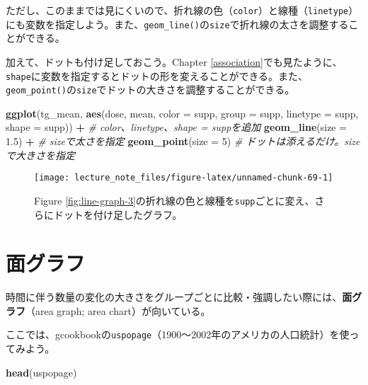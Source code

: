 \documentclass[]{book}
\newenvironment{Shaded}{\begin{snugshade}}{\end{snugshade}}
\newcommand{\KeywordTok}[1]{\textcolor[rgb]{0.13,0.29,0.53}{\textbf{#1}}}
\newcommand{\DataTypeTok}[1]{\textcolor[rgb]{0.13,0.29,0.53}{#1}}
\newcommand{\DecValTok}[1]{\textcolor[rgb]{0.00,0.00,0.81}{#1}}
\newcommand{\FloatTok}[1]{\textcolor[rgb]{0.00,0.00,0.81}{#1}}
\newcommand{\StringTok}[1]{\textcolor[rgb]{0.31,0.60,0.02}{#1}}
\newcommand{\CommentTok}[1]{\textcolor[rgb]{0.56,0.35,0.01}{\textit{#1}}}
\newcommand{\OperatorTok}[1]{\textcolor[rgb]{0.81,0.36,0.00}{\textbf{#1}}}
\newcommand{\NormalTok}[1]{#1}
\begin{document}
ただし、このままでは見にくいので、折れ線の色（\texttt{color}）と線種（\texttt{linetype}）にも変数を指定しよう。また、\texttt{geom\_line()}の\texttt{size}で折れ線の太さを調整することができる。

加えて、ドットも付け足しておこう。Chapter
\ref{association}でも見たように、\texttt{shape}に変数を指定するとドットの形を変えることができる。また、\texttt{geom\_point()}の\texttt{size}でドットの大きさを調整することができる。




\begin{Shaded}
\begin{Highlighting}[]
\KeywordTok{ggplot}\NormalTok{(tg_mean, }\KeywordTok{aes}\NormalTok{(dose, mean, }\DataTypeTok{color =}\NormalTok{ supp, }\DataTypeTok{group =}\NormalTok{ supp, }\DataTypeTok{linetype =}\NormalTok{ supp, }\DataTypeTok{shape =}\NormalTok{ supp)) }\OperatorTok{+}\StringTok{ }\CommentTok{# color、linetype、shape = suppを追加}
\StringTok{  }\KeywordTok{geom_line}\NormalTok{(}\DataTypeTok{size =} \FloatTok{1.5}\NormalTok{) }\OperatorTok{+}\StringTok{ }\CommentTok{# sizeで太さを指定}
\StringTok{  }\KeywordTok{geom_point}\NormalTok{(}\DataTypeTok{size =} \DecValTok{5}\NormalTok{) }\CommentTok{# ドットは添えるだけ。sizeで大きさを指定}
\end{Highlighting}
\end{Shaded}

\begin{figure}

{\centering \texttt{[image: lecture\_note\_files/figure-latex/unnamed-chunk-69-1]} 

}

\caption{Figure
\ref{fig:line-graph-3}の折れ線の色と線種を\texttt{supp}ごとに変え、さらにドットを付け足したグラフ。}\label{fig:unnamed-chunk-69}
\end{figure}

\section{面グラフ}

時間に伴う数量の変化の大きさをグループごとに比較・強調したい際には、\textbf{面グラフ}（area
graph; area chart）が向いている。

ここでは、gcookbookの\texttt{uspopage}（1900〜2002年のアメリカの人口統計）を使ってみよう。

\begin{Shaded}
\begin{Highlighting}[]
\KeywordTok{head}\NormalTok{(uspopage)}
\end{Highlighting}
\end{Shaded}
\end{document}
